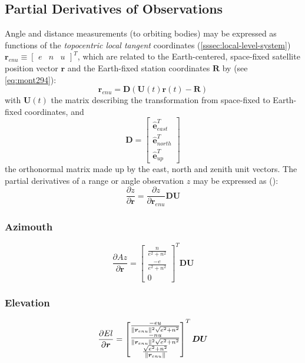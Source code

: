 \subsection{Partial Derivatives of Observations}
Angle and distance measurements (to orbiting bodies) may be expressed as 
functions of the \emph{topocentric local tangent} coordinates 
(\ref{sssec:local-level-system}) 
$\bm{r}_{enu} \equiv \begin{bmatrix}e & n & u \end{bmatrix}^T$, 
which are related to the Earth-centered, space-fixed satellite position vector 
$\bm{r}$ and the Earth-fixed station coordinates $\bm{R}$ by (see 
\ref{eq:mont294}):
\begin{equation}
  \label{eq:mont791}
  \bm{r}_{enu} = \bm{D} \left( \bm{U}(t) \bm{r}(t) - \bm{R} \right)
\end{equation}
with $\bm{U}(t)$ the matrix describing the transformation from space-fixed to 
Earth-fixed coordinates, and
\begin{equation}
  \label{eq:mont792}
  \bm{D} = \begin{bmatrix}
    \hat{\bm{e}}^T_{east} \\
    \hat{\bm{e}}^T_{north} \\
    \hat{\bm{e}}^T_{up}
    \end{bmatrix}
\end{equation}
the orthonormal matrix made up by the east, north and zenith unit vectors. The 
partial derivatives of a range or angle observation $z$ may be expressed as 
(\cite{Montenbruck2000}):
\begin{equation}
  \label{eq:mont793}
  \frac{\partial z}{\partial \bm{r}} 
   = \frac{\partial z}{\partial \bm{r}_{enu}} \bm{D} \bm{U}
\end{equation}

\subsubsection{Azimouth}
\label{sssec:azimouth}
\begin{equation}
  \label{eq:mont798}
  \frac{\partial Az}{\partial \bm{r}} = \begin{bmatrix} 
      \frac{n}{e^2 + n^2} \\
      \frac{-e}{e^2 + n^2} \\
      0 \end{bmatrix}^T
    \bm{D} \bm{U}
\end{equation}

\subsubsection{Elevation}
\label{sssec:elevation}
\begin{equation}
  \label{eq:mont799}
  \frac{\partial El}{\partial \bm{r}} = 
    \begin{bmatrix} 
        \frac{-e u}{ \lVert\bm{r}_{enu}\rVert ^2 \sqrt{e^2 + n^2}} \\
        \frac{-n u}{ \lVert\bm{r}_{enu}\rVert ^2 \sqrt{e^2 + n^2}} \\
        \frac{\sqrt{e^2 + n^2}}{\lVert\bm{r}_{enu}\rVert} 
      \end{bmatrix}^T
    \bm{D} \bm{U}
\end{equation}
